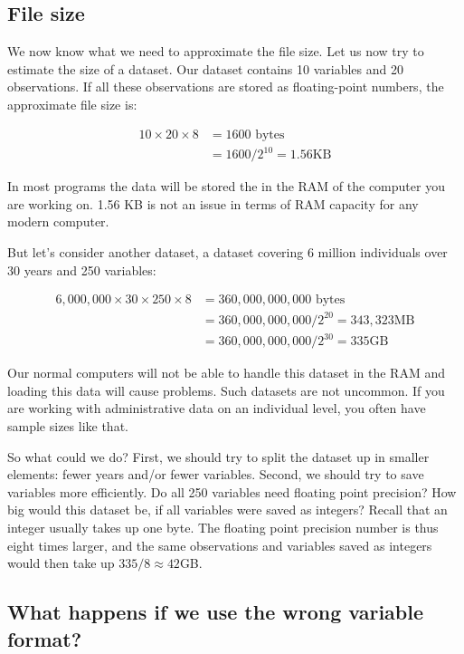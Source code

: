 \documentclass[]{book}
\begin{document}
\hypertarget{file-size}{%
\subsection{File size}\label{file-size}}

We now know what we need to approximate the file size.
Let us now try to estimate the size of a dataset. Our dataset contains 10 variables and 20 observations. If all these observations are stored as floating-point numbers, the approximate file size is:

\begin{align}
10\times20\times8&=1600\text{ bytes} \nonumber\\
&=1600/2^{10}=1.56 \text{KB}\nonumber
\end{align}

In most programs the data will be stored the in the RAM of the computer you are working on. 1.56 KB is not an issue in terms of RAM capacity for any modern computer.

But let's consider another dataset, a dataset covering 6 million individuals over 30 years and 250 variables:

\begin{align}
6,000,000\times 30 \times250 \times8&=360,000,000,000\text{ bytes} \nonumber\\
&=360,000,000,000/2^{20}= 343,323 \text{MB}\nonumber\\
&=360,000,000,000/2^{30}= 335 \text{GB}\nonumber
\end{align}

Our normal computers will not be able to handle this dataset in the RAM and loading this data will cause problems. Such datasets are not uncommon. If you are working with administrative data on an individual level, you often have sample sizes like that.

So what could we do? First, we should try to split the dataset up in smaller elements: fewer years and/or fewer variables. Second, we should try to save variables more efficiently. Do all 250 variables need floating point precision? How big would this dataset be, if all variables were saved as integers? Recall that an integer usually takes up one byte. The floating point precision number is thus eight times larger, and the same observations and variables saved as integers would then take up \(335/8\approx 42\)GB.

\hypertarget{what-happens-if-we-use-the-wrong-variable-format}{%
\subsection{What happens if we use the wrong variable format?}\label{what-happens-if-we-use-the-wrong-variable-format}}
\end{document}
